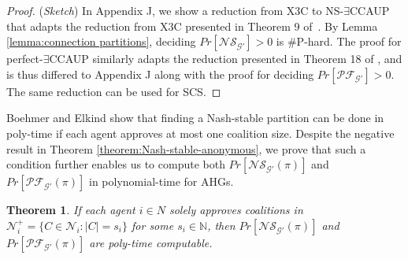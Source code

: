 \documentclass[letterpaper]{article} %
\newtheorem{theorem}{Theorem}
\begin{document}
\begin{proof}
(\textit{Sketch})
In Appendix J, we show a reduction from X3C to NS-$\exists$CCAUP that adapts the reduction from X3C presented in Theorem 9 of~\cite{peters2016complexity}. %
By Lemma \ref{lemma:connection partitions}, deciding $Pr[\mathcal{NS}_{\mathcal{G}'}] > 0$ is \#P-hard. The proof for perfect-$\exists$CCAUP similarly adapts the reduction presented in Theorem 18 of \cite{woeginger2013core}, and is thus differed to Appendix J along with the proof for deciding $Pr[\mathcal{PF}_{\mathcal{G}'}]>0$. The same reduction can be used for SCS.
\end{proof}

Boehmer and Elkind  show that finding a Nash-stable partition can be done in poly-time if each agent approves at most one coalition size. Despite the negative result in Theorem \ref{theorem:Nash-stable-anonymous}, we prove that such a condition further enables us to compute both $Pr[\mathcal{NS}_{\mathcal{G}'}(\pi)]$ and $Pr[\mathcal{PF}_{\mathcal{G}'}(\pi)]$ in polynomial-time for AHGs.
\begin{theorem}
\label{theorem:nash-at most one coalition size}
If each agent $i \in N$ solely approves coalitions in $\mathcal{N}_i^+ = \{C \in \mathcal{N}_i : |C| = s_i\}$ for some $s_i \in \mathbb{N}$, then $Pr[\mathcal{NS}_{\mathcal{G}'}(\pi)]$ and $Pr[\mathcal{PF}_{\mathcal{G}'}(\pi)]$ are poly-time computable.
\end{theorem}
\end{document}
